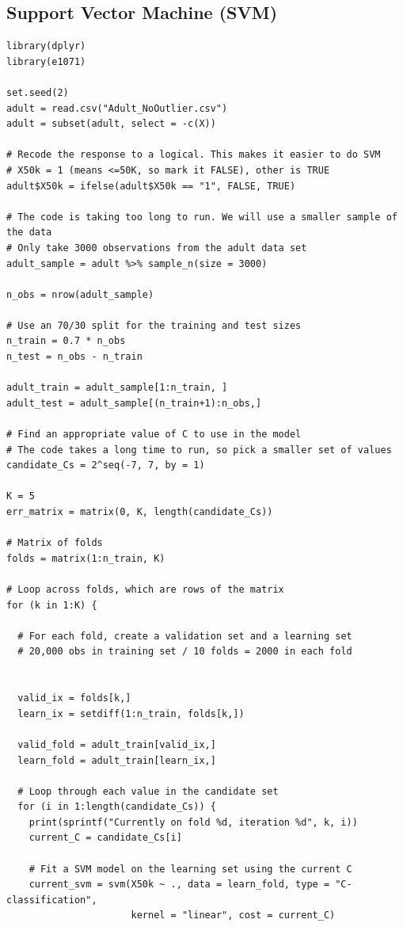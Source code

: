 \documentclass{article}
\begin{document}
\subsection{Support Vector Machine (SVM)} \label{app:SVMCode}

\begin{verbatim}
library(dplyr)
library(e1071)

set.seed(2)
adult = read.csv("Adult_NoOutlier.csv")
adult = subset(adult, select = -c(X))

# Recode the response to a logical. This makes it easier to do SVM
# X50k = 1 (means <=50K, so mark it FALSE), other is TRUE
adult$X50k = ifelse(adult$X50k == "1", FALSE, TRUE)

# The code is taking too long to run. We will use a smaller sample of the data
# Only take 3000 observations from the adult data set 
adult_sample = adult %>% sample_n(size = 3000)

n_obs = nrow(adult_sample)

# Use an 70/30 split for the training and test sizes
n_train = 0.7 * n_obs
n_test = n_obs - n_train

adult_train = adult_sample[1:n_train, ]
adult_test = adult_sample[(n_train+1):n_obs,]

# Find an appropriate value of C to use in the model 
# The code takes a long time to run, so pick a smaller set of values
candidate_Cs = 2^seq(-7, 7, by = 1)

K = 5 
err_matrix = matrix(0, K, length(candidate_Cs))

# Matrix of folds 
folds = matrix(1:n_train, K)

# Loop across folds, which are rows of the matrix 
for (k in 1:K) {
  
  # For each fold, create a validation set and a learning set 
  # 20,000 obs in training set / 10 folds = 2000 in each fold 
  
  
  valid_ix = folds[k,]
  learn_ix = setdiff(1:n_train, folds[k,])
  
  valid_fold = adult_train[valid_ix,]
  learn_fold = adult_train[learn_ix,]
  
  # Loop through each value in the candidate set 
  for (i in 1:length(candidate_Cs)) {
    print(sprintf("Currently on fold %d, iteration %d", k, i))
    current_C = candidate_Cs[i]
    
    # Fit a SVM model on the learning set using the current C
    current_svm = svm(X50k ~ ., data = learn_fold, type = "C-classification",
                      kernel = "linear", cost = current_C)
    

\end{verbatim}
\end{document}
